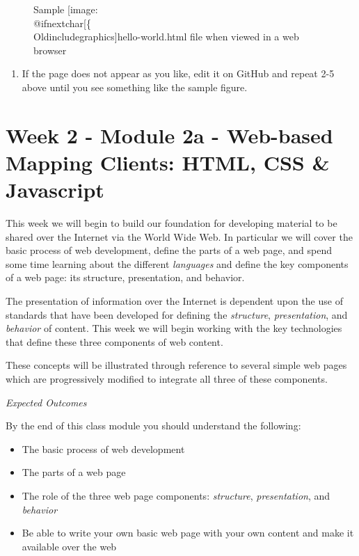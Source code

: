 \documentclass[]{book}
\makeatletter
\providecommand{\tightlist}{%
  \setlength{\itemsep}{0pt}\setlength{\parskip}{0pt}}
\def\ScaleIfNeeded{%
  \ifdim\Gin@nat@width>.5\linewidth
    .5\linewidth
  \else
    \Gin@nat@width
  \fi
}
\let\Oldincludegraphics\texttt{[image: \%
 \\catcode`\\@=11\\relax\%
 \%\\gdef\\includegraphics\{\\@ifnextchar[\{\\Oldincludegraphics]}{\Oldincludegraphics[width=\ScaleIfNeeded]}}%
\gdef\texttt{[image: \\@ifnextchar[\{\\Oldincludegraphics]}{\Oldincludegraphics[max size={.75\textwidth}{.75\textheight}]}}%
\makeatother
\begin{document}
\begin{figure}[htbp]
\centering
\texttt{[image: images/hello-world.png]}
\caption{Sample \texttt{hello-world.html} file when viewed in a web
browser}
\end{figure}

\begin{enumerate}
\def\labelenumi{\arabic{enumi}.}
\setcounter{enumi}{5}
\tightlist
\item
  If the page does not appear as you like, edit it on GitHub and repeat
  2-5 above until you see something like the sample figure.
\end{enumerate}

\chapter{Week 2 - Module 2a - Web-based Mapping Clients: HTML, CSS \&
Javascript}\label{week02}

This week we will begin to build our foundation for developing material
to be shared over the Internet via the World Wide Web. In particular we
will cover the basic process of web development, define the parts of a
web page, and spend some time learning about the different
\emph{languages} and define the key components of a web page: its
structure, presentation, and behavior.

The presentation of information over the Internet is dependent upon the
use of standards that have been developed for defining the
\emph{structure}, \emph{presentation}, and \emph{behavior} of content.
This week we will begin working with the key technologies that define
these three components of web content.

These concepts will be illustrated through reference to several simple
web pages which are progressively modified to integrate all three of
these components.

\emph{Expected Outcomes}

By the end of this class module you should understand the following:

\begin{itemize}
\item
  The basic process of web development
\item
  The parts of a web page
\item
  The role of the three web page components: \emph{structure},
  \emph{presentation}, and \emph{behavior}
\item
  Be able to write your own basic web page with your own content and
  make it available over the web
\end{itemize}
\end{document}
